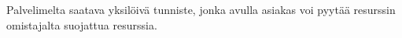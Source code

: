 Palvelimelta saatava yksilöivä tunniste, jonka avulla asiakas voi pyytää resurssin omistajalta suojattua resurssia.